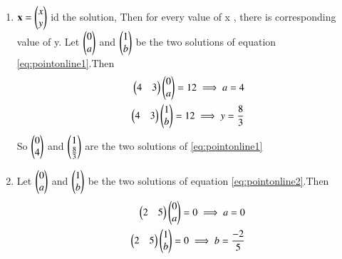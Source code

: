 \renewcommand{\theequation}{\theenumi}
\begin{enumerate}[label=\thesection.\arabic*.,ref=\thesection.\theenumi]

\item $\mathbf{x}=\begin{pmatrix}x\\y\end{pmatrix}$ id the solution, Then for every value of x , there is corresponding value of y. 
Let $\begin{pmatrix}0\\a\end{pmatrix}$ and $\begin{pmatrix}1\\b\end{pmatrix}$ be the two solutions of equation \ref{eq:pointonline1}.Then
\begin{align}
 \begin{pmatrix}4&3\end{pmatrix}\begin{pmatrix}0\\a\end{pmatrix}=12
 \implies a=4
 \\
 \begin{pmatrix}4&3\end{pmatrix}\begin{pmatrix}1\\b\end{pmatrix}=12
 \implies y=\frac{8}{3}
\end{align}
So $\begin{pmatrix}0\\4\end{pmatrix}$ and $\begin{pmatrix}1\\\frac{8}{3}\end{pmatrix}$ are the two solutions of \ref{eq:pointonline1}

\item 
Let $\begin{pmatrix}0\\a\end{pmatrix}$ and $\begin{pmatrix}1\\b\end{pmatrix}$ be the two solutions of equation \ref{eq:pointonline2}.Then
\begin{align}
 \begin{pmatrix}2&5\end{pmatrix}\begin{pmatrix}0\\a\end{pmatrix}=0
 \implies a=0
 \\
 \begin{pmatrix}2&5\end{pmatrix}\begin{pmatrix}1\\b\end{pmatrix}=0
 \implies b=\frac{-2}{5}
\end{align}


\end{enumerate}

